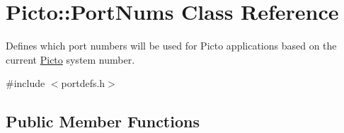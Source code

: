 \hypertarget{class_picto_1_1_port_nums}{\section{Picto\-:\-:Port\-Nums Class Reference}
\label{class_picto_1_1_port_nums}
}


Defines which port numbers will be used for Picto applications based on the current \hyperlink{namespace_picto}{Picto} system number.  




{\ttfamily \#include $<$portdefs.\-h$>$}

\subsection*{Public Member Functions}
